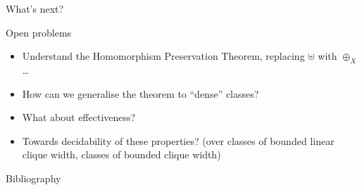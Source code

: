 \documentclass{beamer}
\begin{document}
\begin{frame}{What's next?}
    \begin{exampleblock}{Open problems}
        \begin{itemize}
        \item
          Understand the Homomorphism Preservation Theorem, replacing \(\uplus\)
          with \(\oplus_X\)\ldots{}
        \item
            How can we generalise the theorem to ``dense'' classes?
        \item
          What about effectiveness?
        \item
          Towards decidability of these properties? (over classes of bounded
          linear clique width, classes of bounded clique width)
        \end{itemize}
    \end{exampleblock}
\end{frame}

\begin{frame}[allowframebreaks]{Bibliography}
    \printbibliography[heading=none]
\end{frame}

\appendix
\end{document}
